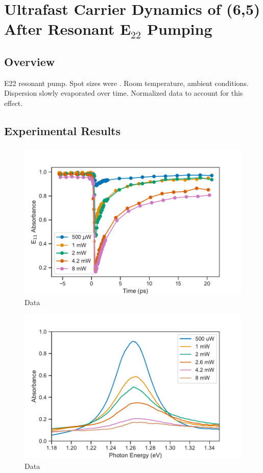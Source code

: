 \chapter{Ultrafast Carrier Dynamics of (6,5) After Resonant E$_{22}$ Pumping}

\section{Overview}

E22 resonant pump. Spot sizes were . Room temperature, ambient conditions. Dispersion slowly evaporated over time. Normalized data to account for this effect.

\section{Experimental Results}

\subsection{}

\begin{figure}[H]
	\centering
	\includegraphics[scale=0.75]{images/chapter_my_data/absorbance_dynamics_E11}
	\caption{Data}
\end{figure}

\begin{figure}[H]
	\centering
	\includegraphics[scale=0.75]{images/chapter_my_data/peak_abs_vs_pump}
	\caption{Data}
\end{figure}

